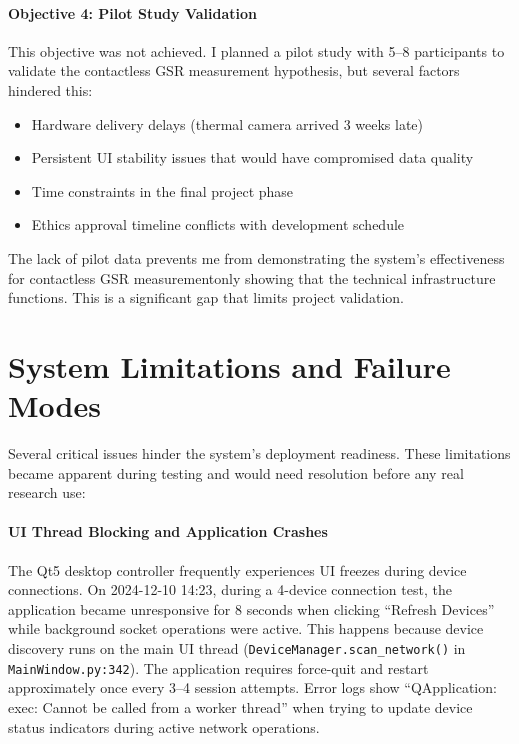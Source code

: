 \paragraph{\textbf{Objective 4: Pilot Study Validation}} This objective was not achieved. I planned a pilot study with 5--8 participants to validate the contactless GSR measurement hypothesis, but several factors hindered this:
\begin{itemize}
    \item Hardware delivery delays (thermal camera arrived 3 weeks late)
    \item Persistent UI stability issues that would have compromised data quality
    \item Time constraints in the final project phase
    \item Ethics approval timeline conflicts with development schedule
\end{itemize}
The lack of pilot data prevents me from demonstrating the system's effectiveness for contactless GSR measurement\textemdash only showing that the technical infrastructure functions. This is a significant gap that limits project validation.


\section{System Limitations and Failure Modes}

Several critical issues hinder the system's deployment readiness. These limitations became apparent during testing and would need resolution before any real research use:

\paragraph{\textbf{UI Thread Blocking and Application Crashes}} The Qt5 desktop controller frequently experiences UI freezes during device connections. On 2024-12-10 14:23, during a 4-device connection test, the application became unresponsive for 8 seconds when clicking ``Refresh Devices'' while background socket operations were active. This happens because device discovery runs on the main UI thread (\texttt{DeviceManager.scan\_network()} in \texttt{MainWindow.py:342}). The application requires force-quit and restart approximately once every 3--4 session attempts. Error logs show ``QApplication: exec: Cannot be called from a worker thread'' when trying to update device status indicators during active network operations.

